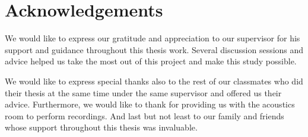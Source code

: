 \chapter*{Acknowledgements} 

We would like to express our gratitude and appreciation to our supervisor for his support and guidance throughout this thesis work.
Several discussion sessions and advice helped us take the most out of this project and make this study possible. 

We would like to express special thanks also to the rest of our classmates who did their thesis at the same time under the same supervisor and offered us their advice. Furthermore, we would like to thank  for providing us with the acoustics room to perform recordings. And last but not least to our family and friends whose support throughout this thesis was invaluable.  